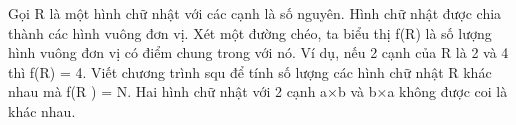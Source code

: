 Gọi R là một hình chữ nhật với các cạnh là số nguyên. Hình chữ nhật được chia thành các hình vuông đơn vị. Xét một đường chéo, ta biểu thị f(R) là số lượng hình vuông đơn vị có điểm chung trong với nó. Ví dụ, nếu 2 cạnh của R là 2 và 4 thì f(R) = 4. Viết chương trình squ để tính số lượng các hình chữ nhật R khác nhau mà f(R ) = N. Hai hình chữ nhật với 2 cạnh a×b và b×a không được coi là khác nhau.